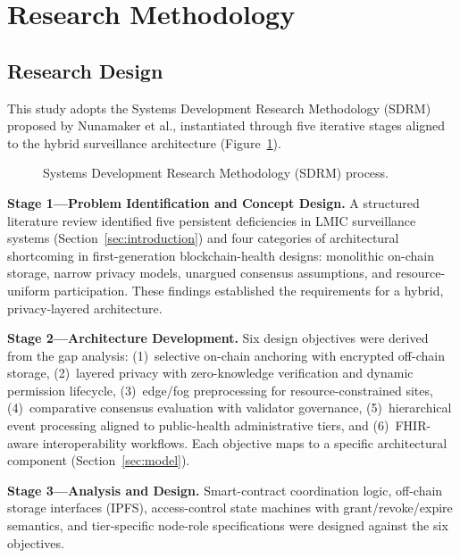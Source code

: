 \section{Research Methodology}\label{sec:methodology}

\subsection{Research Design}\label{subsec:design}

This study adopts the Systems Development Research Methodology (SDRM) proposed by Nunamaker et al.\cite{nunamaker1990systems}, instantiated through five iterative stages aligned to the hybrid surveillance architecture (Figure~\ref{fig:sdrm}).

\begin{figure}[!ht]
\centering
{}
\caption{Systems Development Research Methodology (SDRM) process.}\label{fig:sdrm}
\end{figure}

\textbf{Stage 1---Problem Identification and Concept Design.} A structured literature review identified five persistent deficiencies in LMIC surveillance systems (Section~\ref{sec:introduction}) and four categories of architectural shortcoming in first-generation blockchain-health designs: monolithic on-chain storage, narrow privacy models, unargued consensus assumptions, and resource-uniform participation. These findings established the requirements for a hybrid, privacy-layered architecture.

\textbf{Stage 2---Architecture Development.} Six design objectives were derived from the gap analysis: (1)~selective on-chain anchoring with encrypted off-chain storage, (2)~layered privacy with zero-knowledge verification and dynamic permission lifecycle, (3)~edge/fog preprocessing for resource-constrained sites, (4)~comparative consensus evaluation with validator governance, (5)~hierarchical event processing aligned to public-health administrative tiers, and (6)~FHIR-aware interoperability workflows. Each objective maps to a specific architectural component (Section~\ref{sec:model}).

\textbf{Stage 3---Analysis and Design.} Smart-contract coordination logic, off-chain storage interfaces (IPFS), access-control state machines with grant/revoke/expire semantics, and tier-specific node-role specifications were designed against the six objectives.

